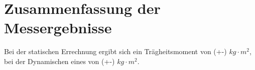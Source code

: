 \section{Zusammenfassung der Messergebnisse}
Bei der statischen Errechnung ergibt sich ein Trägheitsmoment von (+-) $kg\cdot m^{2}$, bei der Dynamischen eines von (+-) $kg\cdot m^{2}$.